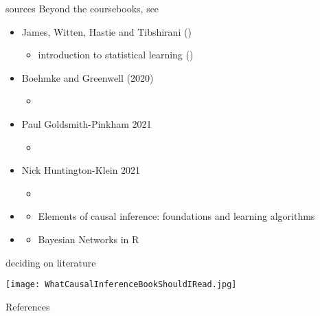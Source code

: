 \documentclass[aspectratio=169]{beamer}
\begin{document}
	\begin{frame}{sources}
		Beyond the coursebooks, see
		\begin{itemize}
			\item James, Witten, Hastie and Tibshirani (\citeyear{James2013})
			\begin{itemize}
				\item introduction to statistical learning (\href{https://www.edx.org/course/statistical-learning}{\underline{}})
			\end{itemize}
			\item Boehmke and Greenwell (2020)
			\begin{itemize}
				\item \href{https://bradleyboehmke.github.io/HOML/}{\underline{}}
			\end{itemize}
			\item Paul Goldsmith-Pinkham 2021
			\begin{itemize}
				\item \href{https://github.com/paulgp/applied-methods-phd}{\underline{}}
			\end{itemize}
			\item Nick Huntington-Klein 2021
			\begin{itemize}
				\item \href{https://nickchk.com/causalitybook.html}{\underline{}}
			\end{itemize}
			\item \cite{Peters2017}
			\begin{itemize}
				\item Elements of causal inference: foundations and learning algorithms
			\end{itemize}
			\item \cite{Nagarajan2013}
			\begin{itemize}
				\item Bayesian Networks in R
			\end{itemize}
		\end{itemize}
	\end{frame}

	\begin{frame}{deciding on literature}
		\begin{center}
			\texttt{[image: WhatCausalInferenceBookShouldIRead.jpg]}
		\end{center}
	\end{frame}



	\begin{frame}[t, allowframebreaks]{References}
	  \printbibliography
	\end{frame}

%
\end{document}
